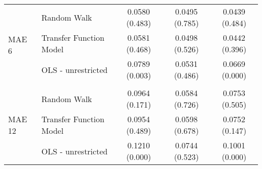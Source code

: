 \begin{table}[!ht]
\begin{tabular}{llccc}
    \\
    \multirow{4}{*}{MAE 6}        & \multicolumn{1}{l}{Random Walk}             &   0.0580 (0.483) & 0.0495 (0.785) & 0.0439 (0.484)\\
                                  & \multicolumn{1}{l}{Transfer Function Model} &   0.0581 (0.468) & 0.0498 (0.526) & 0.0442 (0.396)\\
                                  & \multicolumn{1}{l}{OLS - unrestricted}      &   0.0789 (0.003) & 0.0531 (0.486) & 0.0669 (0.000)\\
     \\
    \multirow{4}{*}{MAE 12}       & \multicolumn{1}{l}{Random Walk}             &   0.0964 (0.171) & 0.0584 (0.726) & 0.0753 (0.505)\\
                                  & \multicolumn{1}{l}{Transfer Function Model} &   0.0954 (0.489) & 0.0598 (0.678) & 0.0752 (0.147)\\
                                  & \multicolumn{1}{l}{OLS - unrestricted}      &   0.1210 (0.000) & 0.0744 (0.523) & 0.1001 (0.000)\\


    \bottomrule
  \end{tabular}
  \label{table:MAEunivariate}
  \vspace{2em}
\end{table}


